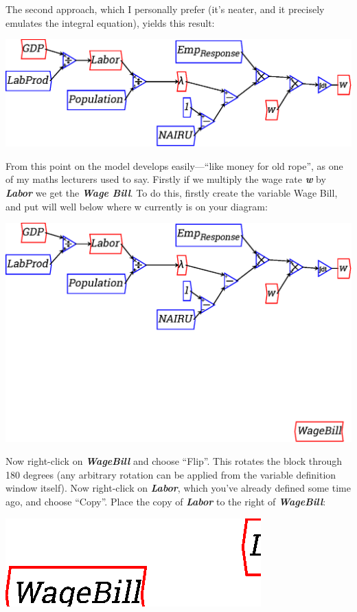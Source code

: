 The second approach, which I personally prefer (it's neater, and it
precisely emulates the integral equation), yields this result: 

\begin{center}
\includegraphics{images/NewItem112.eps}
\end{center}

From this point on the model develops easily---``like money for old
rope'', as one of my maths lecturers used to say. Firstly if we
multiply the wage rate {\bf\em w} by {\bf\em Labor} we get the {\em\bf
Wage Bill}. To do this,
firstly create the variable Wage Bill, and put will well below where w
currently is on your diagram: 

\begin{center}
\includegraphics{images/NewItem113.eps}
\end{center}

Now right-click on {\bf\em WageBill} and choose ``Flip''. This rotates
the block through 180 degrees (any arbitrary rotation can be applied
from the variable definition window itself). Now right-click on
{\bf\em Labor}, which you've already defined some time ago, and choose
``Copy''. Place the copy of {\bf\em Labor} to the right of {\bf\em
WageBill}:

\begin{center}
\includegraphics{images/NewItem98.eps}
\end{center}

